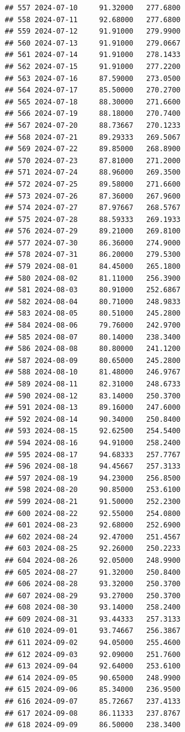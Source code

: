 \documentclass[
]{article}
\begin{document}
\begin{verbatim}
## 557 2024-07-10     91.32000   277.6800
## 558 2024-07-11     92.68000   277.6800
## 559 2024-07-12     91.91000   279.9900
## 560 2024-07-13     91.91000   279.0667
## 561 2024-07-14     91.91000   278.1433
## 562 2024-07-15     91.91000   277.2200
## 563 2024-07-16     87.59000   273.0500
## 564 2024-07-17     85.50000   270.2700
## 565 2024-07-18     88.30000   271.6600
## 566 2024-07-19     88.18000   270.7400
## 567 2024-07-20     88.73667   270.1233
## 568 2024-07-21     89.29333   269.5067
## 569 2024-07-22     89.85000   268.8900
## 570 2024-07-23     87.81000   271.2000
## 571 2024-07-24     88.96000   269.3500
## 572 2024-07-25     89.58000   271.6600
## 573 2024-07-26     87.36000   267.9600
## 574 2024-07-27     87.97667   268.5767
## 575 2024-07-28     88.59333   269.1933
## 576 2024-07-29     89.21000   269.8100
## 577 2024-07-30     86.36000   274.9000
## 578 2024-07-31     86.20000   279.5300
## 579 2024-08-01     84.45000   265.1800
## 580 2024-08-02     81.11000   256.3900
## 581 2024-08-03     80.91000   252.6867
## 582 2024-08-04     80.71000   248.9833
## 583 2024-08-05     80.51000   245.2800
## 584 2024-08-06     79.76000   242.9700
## 585 2024-08-07     80.14000   238.3400
## 586 2024-08-08     80.80000   241.1200
## 587 2024-08-09     80.65000   245.2800
## 588 2024-08-10     81.48000   246.9767
## 589 2024-08-11     82.31000   248.6733
## 590 2024-08-12     83.14000   250.3700
## 591 2024-08-13     89.16000   247.6000
## 592 2024-08-14     90.34000   250.8400
## 593 2024-08-15     92.62500   254.5400
## 594 2024-08-16     94.91000   258.2400
## 595 2024-08-17     94.68333   257.7767
## 596 2024-08-18     94.45667   257.3133
## 597 2024-08-19     94.23000   256.8500
## 598 2024-08-20     90.85000   253.6100
## 599 2024-08-21     91.50000   252.2300
## 600 2024-08-22     92.55000   254.0800
## 601 2024-08-23     92.68000   252.6900
## 602 2024-08-24     92.47000   251.4567
## 603 2024-08-25     92.26000   250.2233
## 604 2024-08-26     92.05000   248.9900
## 605 2024-08-27     91.32000   250.8400
## 606 2024-08-28     93.32000   250.3700
## 607 2024-08-29     93.27000   250.3700
## 608 2024-08-30     93.14000   258.2400
## 609 2024-08-31     93.44333   257.3133
## 610 2024-09-01     93.74667   256.3867
## 611 2024-09-02     94.05000   255.4600
## 612 2024-09-03     92.09000   251.7600
## 613 2024-09-04     92.64000   253.6100
## 614 2024-09-05     90.65000   248.9900
## 615 2024-09-06     85.34000   236.9500
## 616 2024-09-07     85.72667   237.4133
## 617 2024-09-08     86.11333   237.8767
## 618 2024-09-09     86.50000   238.3400

\end{verbatim}
\end{document}
